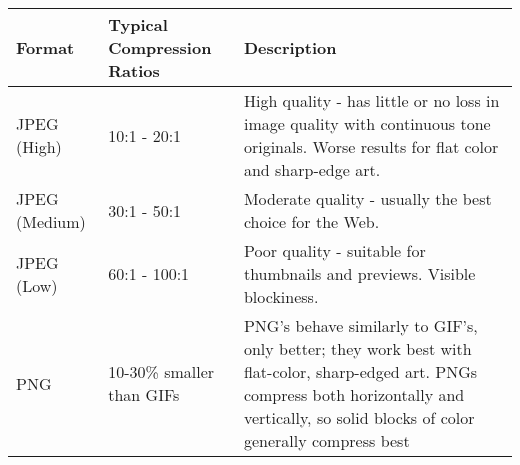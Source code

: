 \begin{table*}
\begin{tabular}{|l||l|p{18em}|}\hline
Format		& Typical Compression Ratios 	& Description \\\hline
JPEG (High)	& 10:1 - 20:1 			& High quality - has little or no  loss in image quality with continuous tone originals. Worse results for flat color and sharp-edge art.\\\hline
JPEG (Medium)	& 30:1 - 50:1			& Moderate quality - usually the best choice for the Web.\\\hline
JPEG (Low) 	& 60:1 - 100:1			& Poor quality - suitable for thumbnails and previews. Visible blockiness.\\\hline
PNG 		& 10-30\% smaller than GIFs	& PNG's behave similarly to GIF's, only better; they work best with flat-color, sharp-edged art. PNGs compress both horizontally and vertically, so solid blocks of color generally compress best \\\hline
\end{tabular}
\end{table*}

